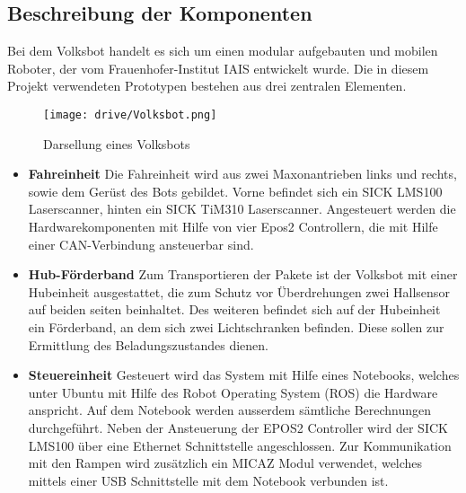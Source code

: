 \subsection{Beschreibung der Komponenten}

Bei dem Volksbot handelt es sich um einen modular aufgebauten und mobilen Roboter, der vom Frauenhofer-Institut IAIS entwickelt wurde. Die in diesem Projekt verwendeten Prototypen bestehen aus drei zentralen Elementen. 

	\begin{figure}[h!]
		\centering
			\texttt{[image: drive/Volksbot.png]}
			\caption{Darsellung eines Volksbots}
			\label{Volksbot}
	\end{figure}	

\begin{itemize}

\item \textbf{Fahreinheit}
Die Fahreinheit wird aus zwei Maxonantrieben links und rechts, sowie dem Gerüst des Bots gebildet. Vorne befindet sich ein SICK LMS100 Laserscanner,  hinten ein SICK TiM310 Laserscanner. Angesteuert werden die Hardwarekomponenten mit Hilfe von vier Epos2 Controllern, die mit Hilfe einer CAN-Verbindung ansteuerbar sind. 

\item \textbf{Hub-Förderband}
Zum Transportieren der Pakete ist der Volksbot mit einer Hubeinheit ausgestattet, die zum Schutz vor Überdrehungen zwei Hallsensor auf beiden seiten beinhaltet. Des weiteren befindet sich auf der Hubeinheit ein Förderband, an dem sich zwei Lichtschranken befinden. Diese sollen zur Ermittlung des Beladungszustandes dienen. 

\item \textbf{Steuereinheit}
Gesteuert wird das System mit Hilfe eines Notebooks, welches unter Ubuntu mit Hilfe des Robot Operating System (ROS) die Hardware anspricht. Auf dem Notebook werden ausserdem sämtliche 
Berechnungen durchgeführt. Neben der Ansteuerung der EPOS2 Controller wird der SICK LMS100 über eine Ethernet Schnittstelle angeschlossen. Zur Kommunikation mit den Rampen wird zusätzlich ein MICAZ Modul verwendet, welches mittels einer USB Schnittstelle mit dem Notebook verbunden ist.

\end{itemize}